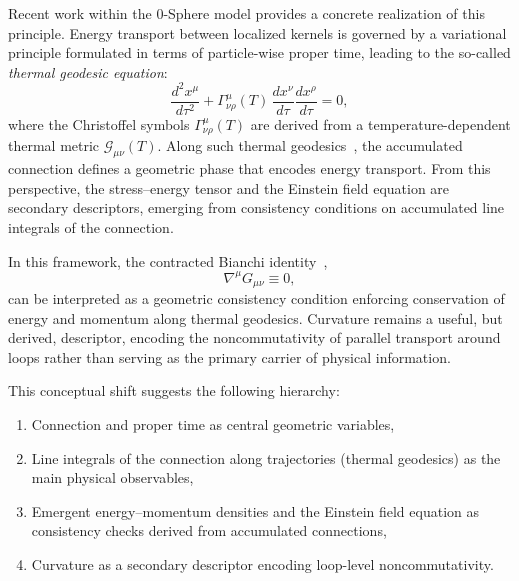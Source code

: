 \documentclass[%
 reprint,
 amsmath,amssymb,
 aps,
 prb,
]{revtex4-2}
\numberwithin{equation}{section}
\begin{document}
Recent work within the 0-Sphere model \cite{hanamura17765017,hanamura18064535,hanamura17765409} provides a concrete realization of this principle. Energy transport between localized kernels is governed by a variational principle formulated in terms of particle-wise proper time, leading to the so-called \emph{thermal geodesic equation}:
\begin{equation} \label{eq:thermal_geodesic}
\frac{d^2 x^\mu}{d\tau^2} + \Gamma^\mu_{\nu\rho}(T) \, \frac{dx^\nu}{d\tau} \frac{dx^\rho}{d\tau} = 0,
\end{equation}
where the Christoffel symbols $\Gamma^\mu_{\nu\rho}(T)$ are derived from a temperature-dependent thermal metric $\mathcal{G}_{\mu\nu}(T)$. Along such thermal geodesics~\cite{hanamura17765017}, the accumulated connection defines a geometric phase that encodes energy transport. From this perspective, the stress--energy tensor and the Einstein field equation are secondary descriptors, emerging from consistency conditions on accumulated line integrals of the connection.

In this framework, the contracted Bianchi identity~\cite{Wald},
\begin{equation}
\nabla^\mu G_{\mu\nu} \equiv 0,
\end{equation}
can be interpreted as a geometric consistency condition enforcing conservation of energy and momentum along thermal geodesics. Curvature remains a useful, but derived, descriptor, encoding the noncommutativity of parallel transport around loops rather than serving as the primary carrier of physical information.

This conceptual shift suggests the following hierarchy:
\begin{enumerate}
\item Connection and proper time as central geometric variables,
\item Line integrals of the connection along trajectories (thermal geodesics) as the main physical observables,
\item Emergent energy--momentum densities and the Einstein field equation as consistency checks derived from accumulated connections,
\item Curvature as a secondary descriptor encoding loop-level noncommutativity.
\end{enumerate}

\clearpage

\end{document}
